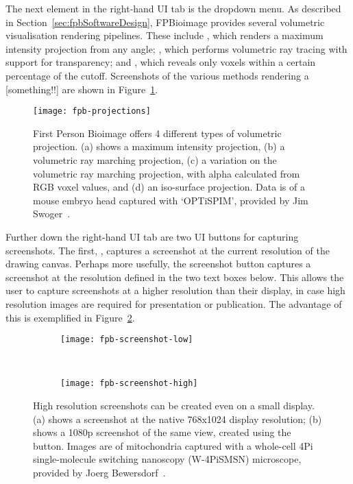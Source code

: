 The next element in the right-hand UI tab is the  dropdown menu.
As described in Section~\ref{sec:fpbSoftwareDesign}, FPBioimage provides several volumetric visualisation rendering pipelines.
These include , which renders a maximum intensity projection from any angle; , which performs volumetric ray tracing with support for transparency; and , which reveals only voxels within a certain percentage of the  cutoff.
Screenshots of the various  methods rendering a [something!!] are shown in Figure~\ref{fig:fpbProjections}.

\begin{figure}[htbp!]
\centering
\texttt{[image: fpb-projections]}
\caption[FPBioimage: Four projection methods highlight different details in volumetric data]{First Person Bioimage offers 4 different types of volumetric projection. (a) shows a maximum intensity projection, (b) a volumetric ray marching projection, (c) a variation on the volumetric ray marching projection, with alpha calculated from RGB voxel values, and (d) an iso-surface projection. Data is of a mouse embryo head captured with `OPTiSPIM', provided by Jim Swoger~\cite{mayer2014optispim}. }
\label{fig:fpbProjections}
\end{figure}

Further down the right-hand UI tab are two UI buttons for capturing screenshots.
The first, , captures a screenshot at the current resolution of the drawing canvas.
Perhaps more usefully, the  screenshot button captures a screenshot at the resolution defined in the two text boxes below.
This allows the user to capture screenshots at a higher resolution than their display, in case high resolution images are required for presentation or publication.
The advantage of this is exemplified in Figure~\ref{fig:fpbScreenshots}.

\begin{figure}[htbp!]
\centering
\begin{subfigure}[b]{1.0\textwidth}
\texttt{[image: fpb-screenshot-low]}
\caption{}
\end{subfigure}

~\newline
\begin{subfigure}[b]{1.0\textwidth}
\texttt{[image: fpb-screenshot-high]}
\caption{}
\end{subfigure}
\caption[FPBioimage: Screenshots allow views to be captured at a higher resolution than the user's display]{High resolution screenshots can be created even on a small display. (a) shows a screenshot at the native 768x1024 display resolution; (b) shows a 1080p screenshot of the same view, created using the  button. Images are of mitochondria captured with a whole-cell 4Pi single-molecule switching nanoscopy (W-4PiSMSN) microscope, provided by Joerg Bewersdorf~\cite{huang2016ultra}. }
\label{fig:fpbScreenshots}
\end{figure}

